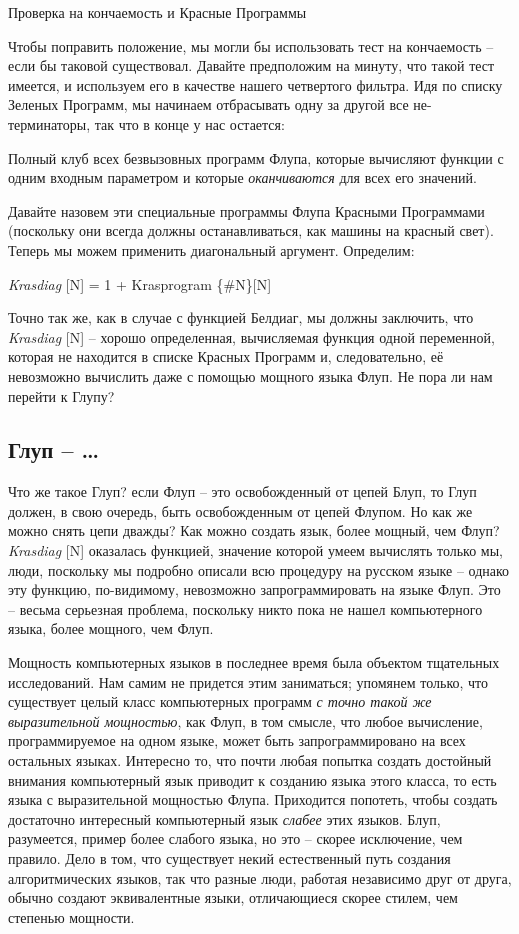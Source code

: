 \documentclass[../main.tex]{subfiles}
\begin{document}
Проверка на кончаемость и Красные Программы

Чтобы поправить положение, мы могли бы использовать тест на кончаемость \--- если бы таковой существовал. Давайте предположим на минуту, что такой тест имеется, и используем его в качестве нашего четвертого фильтра. Идя по списку Зеленых Программ, мы начинаем отбрасывать одну за другой все не-терминаторы, так что в конце у нас остается:

Полный клуб всех безвызовных программ Флупа, которые вычисляют функции с одним входным параметром и которые \emph{оканчиваются} для всех его значений.

Давайте назовем эти специальные программы Флупа Красными Программами (поскольку они всегда должны останавливаться, как машины на красный свет). Теперь мы можем применить диагональный аргумент. Определим:

\emph{Krasdiag} {[}N{]} = 1 + Krasprogram \{\#N\}{[}N{]}

Точно так же, как в случае с функцией Белдиаг, мы должны заключить, что \emph{Krasdiag} {[}N{]} \--- хорошо определенная, вычисляемая функция одной переменной, которая не находится в списке Красных Программ и, следовательно, её невозможно вычислить даже с помощью мощного языка Флуп. Не пора ли нам перейти к Глупу?


\subsection{Глуп \--- \ldots{}}

Что же такое Глуп? если Флуп \--- это освобожденный от цепей Блуп, то Глуп должен, в свою очередь, быть освобожденным от цепей Флупом. Но как же можно снять цепи дважды? Как можно создать язык, более мощный, чем Флуп? \emph{Krasdiag} {[}N{]} оказалась функцией, значение которой умеем вычислять только мы, люди, поскольку мы подробно описали всю процедуру на русском языке \--- однако эту функцию, по-видимому, невозможно запрограммировать на языке Флуп. Это \--- весьма серьезная проблема, поскольку никто пока не нашел компьютерного языка, более мощного, чем Флуп.

Мощность компьютерных языков в последнее время была объектом тщательных исследований. Нам самим не придется этим заниматься; упомянем только, что существует целый класс компьютерных программ \emph{с точно такой же выразительной мощностью}, как Флуп, в том смысле, что любое вычисление, программируемое на одном языке, может быть запрограммировано на всех остальных языках. Интересно то, что почти любая попытка создать достойный внимания компьютерный язык приводит к созданию языка этого класса, то есть языка с выразительной мощностью Флупа. Приходится попотеть, чтобы создать достаточно интересный компьютерный язык \emph{слабее} этих языков. Блуп, разумеется, пример более слабого языка, но это \--- скорее исключение, чем правило. Дело в том, что существует некий естественный путь создания алгоритмических языков, так что разные люди, работая независимо друг от друга, обычно создают эквивалентные языки, отличающиеся скорее стилем, чем степенью мощности.
\end{document}
